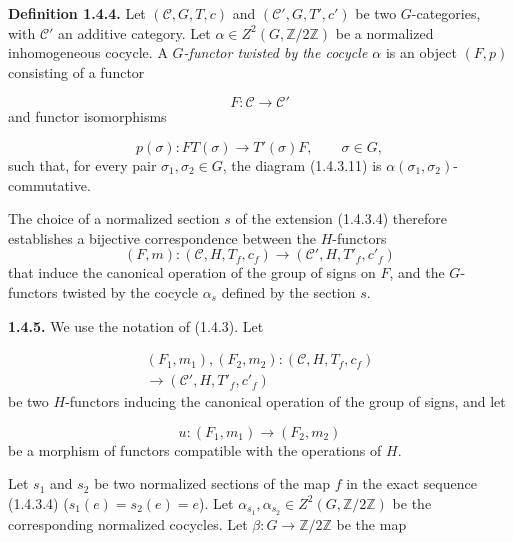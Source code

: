 %
\noindent\textbf{Definition 1.4.4.}\quad
Let $(\mathcal C,G,T,c)$ and $(\mathcal C',G,T',c')$ be two
$G$-categories, with $\mathcal C'$ an additive category. Let
$\alpha\in Z^2(G,\mathbb Z/2\mathbb Z)$ be a normalized
inhomogeneous cocycle. A \emph{$G$-functor twisted by the cocycle
$\alpha$} is an object $(F,p)$ consisting of a functor

\[
  F\colon\mathcal C\longrightarrow\mathcal C'
\]
and functor isomorphisms

\[
  p(\sigma)\colon FT(\sigma)\longrightarrow T'(\sigma)F,
  \qquad \sigma\in G,
\]
such that, for every pair $\sigma_1,\sigma_2\in G$, the diagram
(1.4.3.11) is $\alpha(\sigma_1,\sigma_2)$-commutative.

The choice of a normalized section $s$ of the extension (1.4.3.4)
therefore establishes a bijective correspondence between the
$H$-functors
\[
  (F,m)\colon(\mathcal C,H,T_f,c_f)
  \longrightarrow(\mathcal C',H,T'_f,c'_f)
\]
that induce the canonical operation of the group of signs on $F$, and
the $G$-functors twisted by the cocycle $\alpha_s$ defined by the
section $s$.

\noindent\textbf{1.4.5.}\quad
We use the notation of (1.4.3). Let

\begin{equation}
  \begin{gathered}
    (F_1,m_1),(F_2,m_2)\colon
    (\mathcal C,H,T_f,c_f)\\[-0.2em]
    \longrightarrow(\mathcal C',H,T'_f,c'_f)
  \end{gathered}
  \tag{1.4.5.1}
\end{equation}
be two $H$-functors inducing the canonical operation of the group of
signs, and let

\begin{equation}
  u\colon(F_1,m_1)\longrightarrow(F_2,m_2)
  \tag{1.4.5.2}
\end{equation}
be a morphism of functors compatible with the operations of $H$.

Let $s_1$ and $s_2$ be two normalized sections of the map $f$ in the
exact sequence (1.4.3.4) ($s_1(e)=s_2(e)=e$). Let
$\alpha_{s_1},\alpha_{s_2}\in Z^2(G,\mathbb Z/2\mathbb Z)$ be the
corresponding normalized cocycles. Let
$\beta\colon G\to\mathbb Z/2\mathbb Z$ be the map

